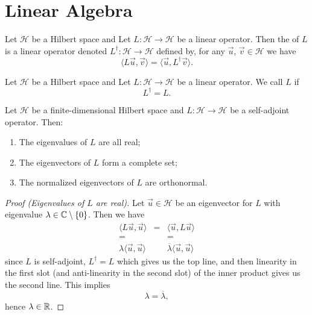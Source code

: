 \section{Linear Algebra}

\begin{definition}
Let $\mathcal{H}$ be a Hilbert space and
Let $L\colon\mathcal{H}\to\mathcal{H}$ be a linear operator.
Then the  of $L$ is a linear operator denoted
$L^{\dagger}\colon\mathcal{H}\to\mathcal{H}$ defined by, for any
$\vec{u}$, $\vec{v}\in\mathcal{H}$ we have
\begin{equation}
\langle L\vec{u},\vec{v}\rangle = \langle \vec{u},L^{\dagger}\vec{v}\rangle.
\end{equation}
\end{definition}

\begin{definition}
Let $\mathcal{H}$ be a Hilbert space and
Let $L\colon\mathcal{H}\to\mathcal{H}$ be a linear operator.
We call $L$  if
\begin{equation}
L^{\dagger} = L.
\end{equation}
\end{definition}


\begin{theorem}
Let $\mathcal{H}$ be a finite-dimensional Hilbert space and
$L\colon \mathcal{H}\to\mathcal{H}$ be a self-adjoint operator. Then:
\begin{enumerate}
\item The eigenvalues of $L$ are all real;
\item The eigenvectors of $L$ form a complete set;
\item The normalized eigenvectors of $L$ are orthonormal.
\end{enumerate}
\end{theorem}

\begin{proof}[Proof (Eigenvalues of $L$ are real)]
Let $\vec{u}\in\mathcal{H}$ be an eigenvector for $L$ with eigenvalue
$\lambda\in\mathbb{C}\setminus\{0\}$. Then we have
\begin{equation}
  \begin{array}{ccc}
    \langle L\vec{u},\vec{u}\rangle & = & \langle \vec{u},L\vec{u}\rangle\\
= &  & =\\
\lambda\langle\vec{u},\vec{u}\rangle & & \overline{\lambda}\langle\vec{u},\vec{u}\rangle
  \end{array}
\end{equation}
since $L$ is self-adjoint, $L^{\dagger}=L$ which gives us the top line,
and then linearity in the first slot (and anti-linearity in the second
slot) of the inner product gives us the second line. This implies
\begin{equation}
\lambda=\overline{\lambda},
\end{equation}
hence $\lambda\in\mathbb{R}$.
\end{proof}

